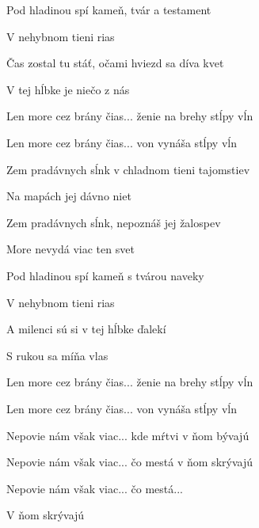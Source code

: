\begin{song}
\bigskip

Pod hladinou spí kameň, tvár a testament \par
{}V nehybnom tieni rias \par
Čas zostal tu stáť, očami hviezd sa díva kvet \par
V tej hĺbke je niečo z nás \par

\bigskip

Len more cez brány čias... ženie na brehy stĺpy vĺn \par
Len more cez brány čias... von vynáša stĺpy vĺn \par

\bigskip

 \par

\bigskip

Zem pradávnych sĺnk v chladnom tieni tajomstiev \par
Na mapách jej dávno niet \par
Zem pradávnych sĺnk, nepoznáš jej žalospev \par
More nevydá viac ten svet \par

\bigskip

Pod hladinou spí kameň s tvárou naveky \par
{}V nehybnom tieni rias \par
A milenci sú si v tej hĺbke ďalekí \par
{}S rukou sa míňa vlas \par

\bigskip

Len more cez brány čias... ženie na brehy stĺpy vĺn \par
Len more cez brány čias... von vynáša stĺpy vĺn \par
{}Nepovie nám však viac... kde mŕtvi v ňom bývajú \par
{}Nepovie nám však viac... čo mestá v ňom skrývajú \par
{}Nepovie nám však viac... čo mestá... \par
V ňom skrývajú  \par

\end{song}